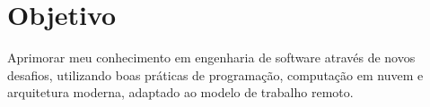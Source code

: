 \documentclass[a4paper]{curriculo}
\begin{document}
\makeprofile


\cvtitle
%
%
\section{Objetivo}
    Aprimorar meu conhecimento em engenharia de software através de novos desafios, utilizando boas práticas de programação, computação em nuvem e arquitetura moderna, adaptado ao modelo de trabalho remoto. \\

\end{document}
